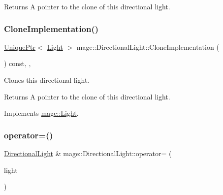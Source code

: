 \begin{DoxyReturn}{Returns}
A pointer to the clone of this directional light. 
\end{DoxyReturn}
\hypertarget{classmage_1_1_directional_light_a122d3dcd7633a85ef8a85e7d768da36d}{}\label{classmage_1_1_directional_light_a122d3dcd7633a85ef8a85e7d768da36d} 
\subsubsection{\texorpdfstring{Clone\+Implementation()}{CloneImplementation()}}
{\footnotesize\ttfamily \hyperlink{namespacemage_a8c307fbcc33bce9b7f2aa4c26c3b95cf}{Unique\+Ptr}$<$ \hyperlink{classmage_1_1_light}{Light} $>$ mage\+::\+Directional\+Light\+::\+Clone\+Implementation (\begin{DoxyParamCaption}{ }\end{DoxyParamCaption}) const\hspace{0.3cm}{\ttfamily [override]}, {\ttfamily [private]}, {\ttfamily [virtual]}}

Clones this directional light.

\begin{DoxyReturn}{Returns}
A pointer to the clone of this directional light. 
\end{DoxyReturn}


Implements \hyperlink{classmage_1_1_light_aa613d76a1ebda69efde853d15f75490c}{mage\+::\+Light}.

\hypertarget{classmage_1_1_directional_light_a371d3c13d6e59c8d105da058b460874d}{}\label{classmage_1_1_directional_light_a371d3c13d6e59c8d105da058b460874d} 
\subsubsection{\texorpdfstring{operator=()}{operator=()}\hspace{0.1cm}{\footnotesize\ttfamily [1/2]}}
{\footnotesize\ttfamily \hyperlink{classmage_1_1_directional_light}{Directional\+Light} \& mage\+::\+Directional\+Light\+::operator= (\begin{DoxyParamCaption}\item[{const \hyperlink{classmage_1_1_directional_light}{Directional\+Light} \&}]{light }\end{DoxyParamCaption})\hspace{0.3cm}{\ttfamily [default]}}

